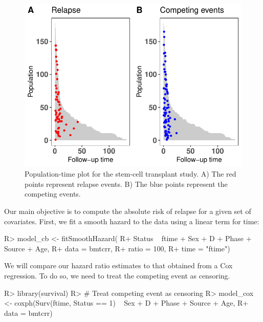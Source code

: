 \documentclass[
]{jss}
\begin{document}
\begin{CodeChunk}
\begin{figure}

{\centering \includegraphics{../figures/compPop-1} 

}

\caption[Population-time plot for the stem-cell transplant study]{Population-time plot for the stem-cell transplant study. A) The red points represent relapse events. B) The blue points represent the competing events.}\label{fig:compPop}
\end{figure}
\end{CodeChunk}

Our main objective is to compute the absolute risk of relapse for a
given set of covariates. First, we fit a smooth hazard to the data using
a linear term for time:

\begin{CodeChunk}

\begin{CodeInput}
R> model_cb <- fitSmoothHazard(
R+     Status ~ ftime + Sex + D + Phase + Source + Age, 
R+     data = bmtcrr, 
R+     ratio = 100, 
R+     time = "ftime")
\end{CodeInput}
\end{CodeChunk}

We will compare our hazard ratio estimates to that obtained from a Cox
regression. To do so, we need to treat the competing event as censoring.

\begin{CodeChunk}

\begin{CodeInput}
R> library(survival)
R> # Treat competing event as censoring
R> model_cox <- coxph(Surv(ftime, Status == 1) ~ Sex + D + Phase + Source + Age,
R+                    data = bmtcrr)
\end{CodeInput}
\end{CodeChunk}
\end{document}
